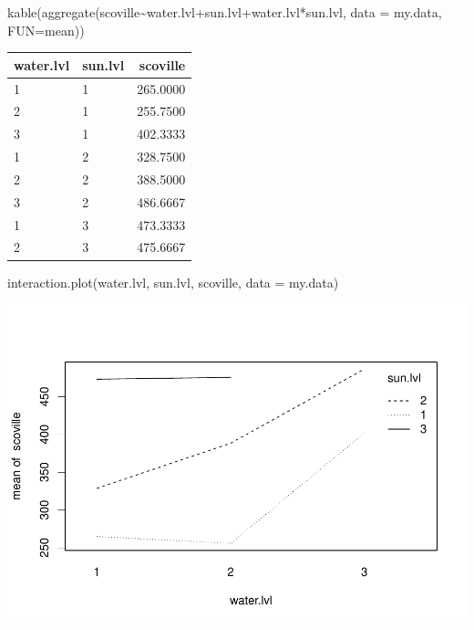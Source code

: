 \documentclass[
]{book}
\newenvironment{Shaded}{\begin{snugshade}}{\end{snugshade}}
\newcommand{\AttributeTok}[1]{\textcolor[rgb]{0.77,0.63,0.00}{#1}}
\newcommand{\FunctionTok}[1]{\textcolor[rgb]{0.00,0.00,0.00}{#1}}
\newcommand{\NormalTok}[1]{#1}
\newcommand{\SpecialCharTok}[1]{\textcolor[rgb]{0.00,0.00,0.00}{#1}}
\begin{document}
\begin{Shaded}
\begin{Highlighting}[]
\FunctionTok{kable}\NormalTok{(}\FunctionTok{aggregate}\NormalTok{(scoville}\SpecialCharTok{\textasciitilde{}}\NormalTok{water.lvl}\SpecialCharTok{+}\NormalTok{sun.lvl}\SpecialCharTok{+}\NormalTok{water.lvl}\SpecialCharTok{*}\NormalTok{sun.lvl, }\AttributeTok{data =}\NormalTok{ my.data, }\AttributeTok{FUN=}\NormalTok{mean))}
\end{Highlighting}
\end{Shaded}

\begin{tabular}{l|l|r}
\hline
water.lvl & sun.lvl & scoville\\
\hline
1 & 1 & 265.0000\\
\hline
2 & 1 & 255.7500\\
\hline
3 & 1 & 402.3333\\
\hline
1 & 2 & 328.7500\\
\hline
2 & 2 & 388.5000\\
\hline
3 & 2 & 486.6667\\
\hline
1 & 3 & 473.3333\\
\hline
2 & 3 & 475.6667\\
\hline
\end{tabular}

\begin{Shaded}
\begin{Highlighting}[]
\FunctionTok{interaction.plot}\NormalTok{(water.lvl, sun.lvl,  scoville, }\AttributeTok{data =}\NormalTok{ my.data)}
\end{Highlighting}
\end{Shaded}

\includegraphics{10-MissingCellsInTwoWay_files/figure-latex/unnamed-chunk-3-1.pdf}
\end{document}
